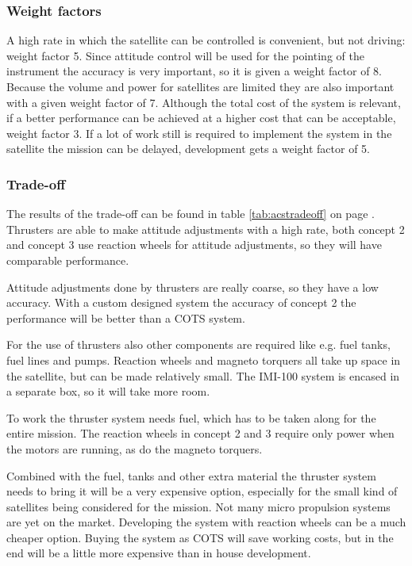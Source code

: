 \subsubsection{Weight factors}
A high rate in which the satellite can be controlled is convenient, but not driving: weight factor 5. Since attitude control will be used for the pointing of the instrument the accuracy is very important, so it is given a weight factor of 8. Because the volume and power for satellites are limited they are also important with a given weight factor of 7. Although the total cost of the system is relevant, if a better performance can be achieved at a higher cost that can be acceptable, weight factor 3. If a lot of work still is required to implement the system in the satellite the mission can be delayed, development gets a weight factor of 5.
\subsubsection{Trade-off}
The results of the trade-off can be found in table \ref{tab:acstradeoff} on page \pageref{tab:acstradeoff}.
Thrusters are able to make attitude adjustments with a high rate, both concept 2 and concept 3 use reaction wheels for attitude adjustments, so they will have comparable performance.

Attitude adjustments done by thrusters are really coarse, so they have a low accuracy. With a custom designed system the accuracy of concept 2 the performance will be better than a \ac{COTS} system.

For the use of thrusters also other components are required like e.g. fuel tanks, fuel lines and pumps. Reaction wheels and magneto torquers all take up space in the satellite, but can be made relatively small. The IMI-100 system is encased in a separate box, so it will take more room.

To work the thruster system needs fuel, which has to be taken along for the entire mission. The reaction wheels in concept 2 and 3 require only power when the motors are running, as do the magneto torquers.

Combined with the fuel, tanks and other extra material the thruster system needs to bring it will be a very expensive option, especially for the small kind of satellites being considered for the mission. Not many micro propulsion systems are yet on the market. Developing the system with reaction wheels can be a much cheaper option. Buying the system as \ac{COTS} will save working costs, but in the end will be a little more expensive than in house development.

